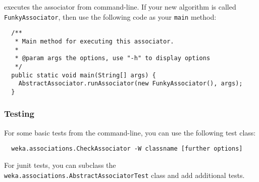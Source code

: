 \newpage
{}
executes the associator from command-line. If your new algorithm is called
\texttt{FunkyAssociator}, then use the following code as your \texttt{main}
method:
\begin{verbatim}
  /**
   * Main method for executing this associator.
   *
   * @param args the options, use "-h" to display options
   */
  public static void main(String[] args) {
    AbstractAssociator.runAssociator(new FunkyAssociator(), args);
  }
\end{verbatim}

\subsubsection*{Testing}
For some basic tests from the command-line, you can use the following test
class:
\begin{verbatim}
  weka.associations.CheckAssociator -W classname [further options]
\end{verbatim}
For junit tests, you can subclass the
\texttt{weka.associations.AbstractAssociatorTest} class and add additional
tests.
